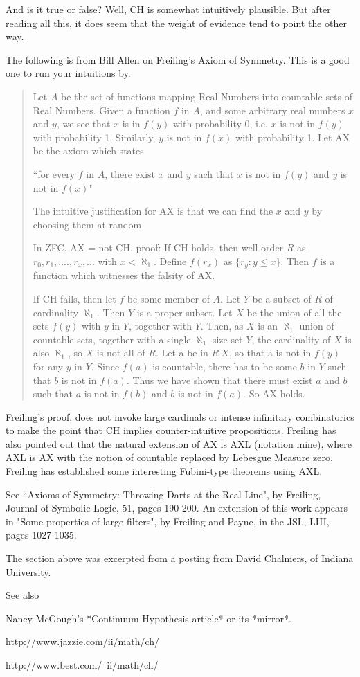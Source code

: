  And is it true or false?  Well, CH is somewhat intuitively
plausible.  But after reading all this, it does seem that the weight of
evidence tend to point the other way.

The following is from Bill Allen on Freiling's Axiom of Symmetry.
This is a good one to run your intuitions by.
\begin{quote}
Let $A$ be the set of functions mapping Real Numbers into countable sets
of Real Numbers.  Given a function $f$ in $A$, and some arbitrary real
numbers $x$ and $y$, we see that $x$ is in $f(y)$ with probability 0, i.e. $x$
 is
not in $f(y)$ with probability 1.  Similarly, $y$ is not in $f(x)$ with
probability 1.  Let AX be the axiom which states

     ``for every $f$ in $A$, there exist $x$ and $y$ such that $x$ is not in 
$f(y)$
      and $y$ is not in $f(x)$"

The intuitive justification for AX is that we can find the $x$ and $y$ by
choosing them at random.

In ZFC, AX = not CH.
proof:
If CH holds, then well-order $R$ as $r_0, r_1, .... , r_x, ...$
with $x < \aleph_1$.  Define $f(r_x)$ as $\{r_y : y \leq x\}$.  Then $f$ is a
function which witnesses the falsity of AX.

If CH fails, then let $f$ be some member of $A$.  Let $Y$ be a subset of $R$ of
cardinality $\aleph_1$.  Then $Y$ is a proper subset.  Let $X$ be the union of
all the sets $f(y)$ with $y$ in $Y$, together with $Y$.  Then, as $X$ is an
$\aleph_1$ union of countable sets, together with a single $\aleph_1$ size set
$Y$, the cardinality of $X$ is also $\aleph_1$, so $X$ is not all of $R$. 
 Let a be
in $R \ X$, so that a is not in $f(y)$ for any $y$ in $Y$.  Since $f(a)$ is
countable, there has to be some $b$ in $Y$ such that $b$ is not in $f(a)$. 
 Thus
we have shown that there must exist $a$ and $b$ such that $a$ is not in $f(b)$
and $b$ is not in $f(a)$.  So AX holds. 
\end{quote}
Freiling's proof, does not invoke large cardinals or
intense infinitary combinatorics to make the point that CH implies
counter-intuitive propositions.  Freiling has also pointed out that the
natural extension of AX is AXL (notation mine), where AXL is AX with
the notion of countable replaced by Lebesgue Measure zero.  Freiling has
established some interesting Fubini-type theorems using AXL.

See ``Axioms of Symmetry: Throwing Darts at the Real Line", by Freiling,
Journal of Symbolic Logic, 51, pages 190-200.  An extension of this work
appears in "Some properties of large filters", by Freiling and Payne, in
the JSL, LIII, pages 1027-1035.

The section above was excerpted from a posting from David Chalmers,
of Indiana University.


See also

   Nancy McGough's *Continuum Hypothesis article* or its *mirror*.


 http://www.jazzie.com/ii/math/ch/


 http://www.best.com/~ii/math/ch/

